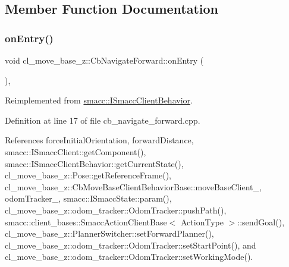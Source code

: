 \subsection{Member Function Documentation}
\mbox{\label{classcl__move__base__z_1_1CbNavigateForward_af9a2e49071de287922c3f5963a079b95}} 
\subsubsection{\texorpdfstring{on\+Entry()}{onEntry()}}
{\footnotesize\ttfamily void cl\+\_\+move\+\_\+base\+\_\+z\+::\+Cb\+Navigate\+Forward\+::on\+Entry (\begin{DoxyParamCaption}{ }\end{DoxyParamCaption})\hspace{0.3cm}{\ttfamily [override]}, {\ttfamily [virtual]}}



Reimplemented from \hyperlink{classsmacc_1_1ISmaccClientBehavior_a9877684b1954429719826e2d0924d980}{smacc\+::\+I\+Smacc\+Client\+Behavior}.



Definition at line 17 of file cb\+\_\+navigate\+\_\+forward.\+cpp.



References force\+Initial\+Orientation, forward\+Distance, smacc\+::\+I\+Smacc\+Client\+::get\+Component(), smacc\+::\+I\+Smacc\+Client\+Behavior\+::get\+Current\+State(), cl\+\_\+move\+\_\+base\+\_\+z\+::\+Pose\+::get\+Reference\+Frame(), cl\+\_\+move\+\_\+base\+\_\+z\+::\+Cb\+Move\+Base\+Client\+Behavior\+Base\+::move\+Base\+Client\+\_\+, odom\+Tracker\+\_\+, smacc\+::\+I\+Smacc\+State\+::param(), cl\+\_\+move\+\_\+base\+\_\+z\+::odom\+\_\+tracker\+::\+Odom\+Tracker\+::push\+Path(), smacc\+::client\+\_\+bases\+::\+Smacc\+Action\+Client\+Base$<$ Action\+Type $>$\+::send\+Goal(), cl\+\_\+move\+\_\+base\+\_\+z\+::\+Planner\+Switcher\+::set\+Forward\+Planner(), cl\+\_\+move\+\_\+base\+\_\+z\+::odom\+\_\+tracker\+::\+Odom\+Tracker\+::set\+Start\+Point(), and cl\+\_\+move\+\_\+base\+\_\+z\+::odom\+\_\+tracker\+::\+Odom\+Tracker\+::set\+Working\+Mode().


